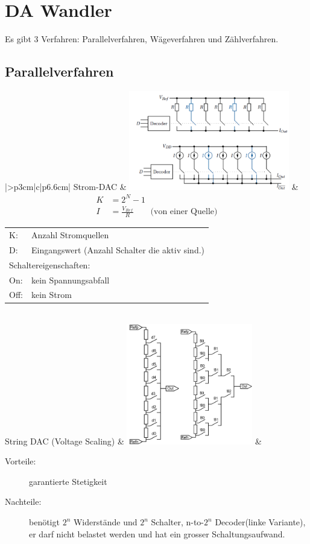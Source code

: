 \section{DA Wandler}
  Es gibt 3 Verfahren: Parallelverfahren, Wägeverfahren und Zählverfahren.

\subsection{Parallelverfahren}

\renewcommand{\arraystretch}{1}
\begin{tabular}{|>{\bfseries}p{3cm}|c|p{6.6cm}|}
	\hline
	Strom-DAC \hartl{456} 
	& \includegraphics[width=7cm, valign=t]{pictures/Strom-DAC}
	& {\begin{align*}
      K &=2^N-1\\
      I &=\frac{V_{Ref}}{R} \qquad \text{(von einer Quelle)}
	  \end{align*}}
	  \begin{tabular}{lp{5cm}}
	  	K: & Anzahl Stromquellen \\
      D: & Eingangswert (Anzahl Schalter die aktiv sind.) \\
      \multicolumn{2}{l}{Schaltereigenschaften:}\\
      On: & kein Spannungsabfall  \\
      Off: & kein Strom
    \end{tabular} 
	\\ \hline
	String DAC (Voltage Scaling) 
	& \includegraphics[width=5.5cm, valign=t]{pictures/string_DAC}
	& 
		\begin{description}
  		\item[Vorteile: ] garantierte Stetigkeit
  		\item[Nachteile:] benötigt $2^n$ Widerstände und $2^n$ Schalter, n-to-$2^n$ Decoder(linke Variante),
        er darf nicht belastet werden und hat ein grosser Schaltungsaufwand.
	  \end{description} 
    

\end{tabular}
